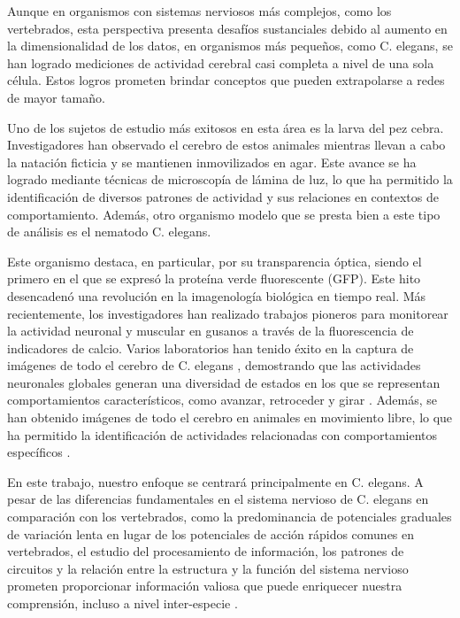 Aunque en organismos con sistemas nerviosos más complejos, como los vertebrados, esta perspectiva presenta desafíos sustanciales debido al aumento en la dimensionalidad de los datos, en organismos más pequeños, como C. elegans, se han logrado mediciones de actividad cerebral casi completa a nivel de una sola célula. Estos logros prometen brindar conceptos que pueden extrapolarse a redes de mayor tamaño.

Uno de los sujetos de estudio más exitosos en esta área es la larva del pez cebra. Investigadores han observado el cerebro de estos animales mientras llevan a cabo la natación ficticia y se mantienen inmovilizados en agar. Este avance se ha logrado mediante técnicas de microscopía de lámina de luz, lo que ha permitido la identificación de diversos patrones de actividad y sus relaciones en contextos de comportamiento. Además, otro organismo modelo que se presta bien a este tipo de análisis es el nematodo C. elegans. 

Este organismo destaca, en particular, por su transparencia óptica, siendo el primero en el que se expresó la proteína verde fluorescente (GFP). Este hito desencadenó una revolución en la imagenología biológica en tiempo real. Más recientemente, los investigadores han realizado trabajos pioneros para monitorear la actividad neuronal y muscular en gusanos a través de la fluorescencia de indicadores de calcio. Varios laboratorios han tenido éxito en la captura de imágenes de todo el cerebro de C. elegans \cite{kaplan_nested_2020,kato_global_2015,yemini_neuropal_2021}, demostrando que las actividades neuronales globales generan una diversidad de estados en los que se representan comportamientos característicos, como avanzar, retroceder y girar \cite{kato_global_2015}. Además, se han obtenido imágenes de todo el cerebro en animales en movimiento libre, lo que ha permitido la identificación de actividades relacionadas con comportamientos específicos \cite{kaplan_nested_2020}.


En este trabajo, nuestro enfoque se centrará principalmente en C. elegans. A pesar de las diferencias fundamentales en el sistema nervioso de C. elegans en comparación con los vertebrados, como la predominancia de potenciales graduales de variación lenta en lugar de los potenciales de acción rápidos comunes en vertebrados, el estudio del procesamiento de información, los patrones de circuitos y la relación entre la estructura y la función del sistema nervioso prometen proporcionar información valiosa que puede enriquecer nuestra comprensión, incluso a nivel inter-especie \cite{randi_measuring_2020}.


